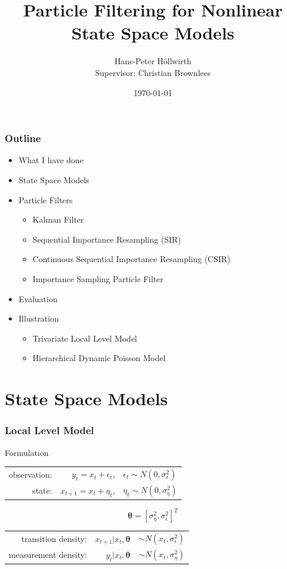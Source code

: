 \documentclass[11pt]{beamer}
\title[Master Project]{Particle Filtering for Nonlinear State Space Models}
\author[]{Hans-Peter H{\"o}llwirth \\ Supervisor: Christian Brownlees}
\institute[BGSE]{Barcelona Graduate School of Economics}
\date{\today}
\begin{document}
\frame{\titlepage}

\begin{frame}
\frametitle{Outline}
\begin{itemize}
\item What I have done
\item State Space Models
\item Particle Filters
	\begin{itemize}
	\item Kalman Filter
	\item Sequential Importance Resampling (SIR)
	\item Continuous Sequential Importance Resampling (CSIR)
	\item Importance Sampling Particle Filter
	\end{itemize}
\item Evaluation
\item Illustration
	\begin{itemize}
	\item Trivariate Local Level Model
	\item Hierarchical Dynamic Poisson Model
	\end{itemize}
\end{itemize}
\end{frame}

\section{State Space Models}

\begin{frame}
\frametitle{Local Level Model}
\begin{block}{Formulation}
\begin{center}
\begin{tabular}{ r r l }
  observation: & $y_t = x_t + \epsilon_t$, & $\epsilon_t \sim N(0,\sigma_{\epsilon}^2)$ \\
  state: & $x_{t+1} = x_t + \eta_t$, & $\eta_t \sim N(0,\sigma_{\eta}^2)$ \\
\end{tabular}
\end{center}
\end{block}
$$
\boldsymbol{\theta} = [\sigma_{\eta}^2,  \sigma_{\epsilon}^2]^T
$$
\begin{center}
\begin{tabular}{ r r l }
  transition density: & $x_{t+1} | x_t, \boldsymbol{\theta}$ & $\sim N(x_t,\sigma_{\epsilon}^2)$ \\
  measurement density: & $y_t | x_t, \boldsymbol{\theta}$ & $\sim N(x_t,\sigma_{\eta}^2)$ \\
\end{tabular}
\end{center}
\end{frame}
\end{document}
